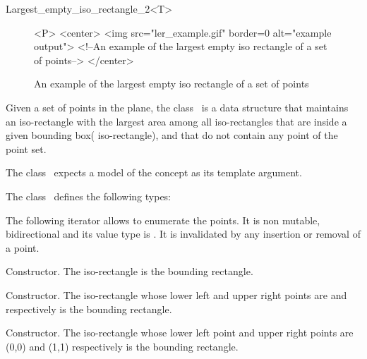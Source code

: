 \begin{ccRefClass}{Largest_empty_iso_rectangle_2<T>}
\begin{figure}[h]
\caption{An example of the largest empty iso rectangle of a set of points
\label{LER:example_pic}}

\begin{ccHtmlOnly}
    <P>
    <center>
        <img src="ler_example.gif"  border=0 alt="example output">
        <!--An example of the largest empty iso rectangle of a set of points-->
    </center>
\end{ccHtmlOnly}
\end{figure}

\ccDefinition
  
Given a set of points in the plane, the class \ccRefName\ is a data
structure that maintains an iso-rectangle with the largest area among
all iso-rectangles that are inside a given bounding box( iso-rectangle), and
that do not contain any point of the point set.

The class \ccRefName\ expects a model of the concept  as its template argument.  



\ccTypes
The class \ccClassTemplateName\ defines the following types:

\ccThreeToTwo


\ccGlue
{}


The following iterator allows to enumerate the points. 
It is non mutable, bidirectional
and its value type is . 
It is invalidated by any insertion or removal of a point. 



\ccCreation
{}  %

{Constructor. The iso-rectangle  is the bounding rectangle.} 

{Constructor. The iso-rectangle whose lower left and upper right points are  and
 respectively is the bounding rectangle.} 

{Constructor. The iso-rectangle whose lower left point and upper right points are (0,0) 
and (1,1) respectively is the bounding rectangle.} 


\end{ccRefClass}
